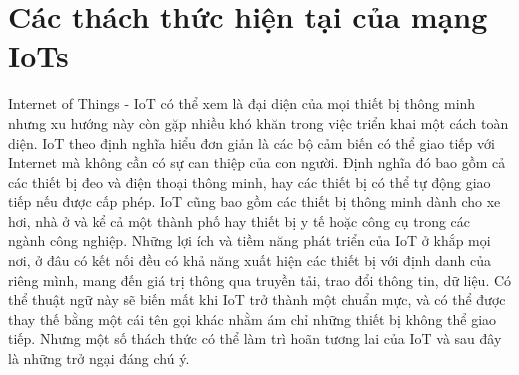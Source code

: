 \section{Các thách thức hiện tại của mạng IoTs}
Internet of Things - IoT có thể xem là đại diện của mọi thiết bị thông minh nhưng xu hướng này còn gặp nhiều khó khăn trong việc triển khai một cách toàn diện. IoT theo định nghĩa hiểu đơn giản là các bộ cảm biến có thể giao tiếp với Internet mà không cần có sự can thiệp của con người. Định nghĩa đó bao gồm cả các thiết bị đeo và điện thoại thông minh, hay các thiết bị có thể tự động giao tiếp nếu được cấp phép. IoT cũng bao gồm các thiết bị thông minh dành cho xe hơi, nhà ở và kể cả một thành phố hay thiết bị y tế hoặc công cụ trong các ngành công nghiệp. Những lợi ích và tiềm năng phát triển của IoT ở khắp mọi nơi, ở đâu có kết nối đều có khả năng xuất hiện các thiết bị với định danh của riêng mình, mang đến giá trị thông qua truyền tải, trao đổi thông tin, dữ liệu. Có thể thuật ngữ này sẽ biến mất khi IoT trở thành một chuẩn mực, và có thể được thay thế bằng một cái tên gọi khác nhằm ám chỉ những thiết bị không thể giao tiếp. Nhưng một số thách thức có thể làm trì hoãn tương lai của IoT và sau đây là những trở ngại đáng chú ý.\\

